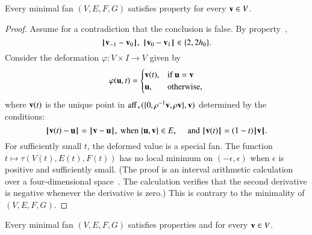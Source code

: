 \begin{lemma}
Every minimal fan $(V,E,F,G)$ satisfies property  for every $\v\in V$.
\end{lemma}

\begin{proof} %
Assume for a contradiction that the conclusion is false.  By property~, 
$$
\norm{\v_{-1}}{\v_0},~\norm{\v_0}{\v_1}\in \{2,2\hm\}.
$$
Consider the deformation $\varphi:V\times I\to V$ given by
$$
\varphi(\u,t) =
\begin{cases}
\v(t), & \text{if } \u=\v\\
\u, & \text{otherwise},\\
\end{cases}
$$
where $\v(t)$ is the unique point in $\op{aff}_+(\{0,\rho^{-1}\v,\rho \v\},\v)$ determined by the conditions:
$$
\norm{\v(t)}{\u} = \norm{\v}{\u}, \text{~when~} \{\u,\v\}\in E,\quad
\text{~and~}
\normo{\v(t)} = (1-t)\normo{\v}.
$$
For sufficiently small $t$, the deformed value  is a special fan.
The function
$t\mapsto\tau(V(t),E(t),F(t))$ has no local minimum on $(-\epsilon,\epsilon)$ when $\epsilon$ is positive and sufficiently small.
(The proof is an interval arithmetic calculation over a four-dimensional space~\cite[cc:d2a]{hales:2009:nonlinear}.  %
The calculation verifies  that the second derivative is negative whenever the derivative is zero.)  This is contrary to the minimality of $(V,E,F,G)$.
\end{proof}




\begin{lemma} 
Every minimal fan $(V,E,F,G)$ satisfies properties  and  for every $\v\in V$.
\end{lemma}

